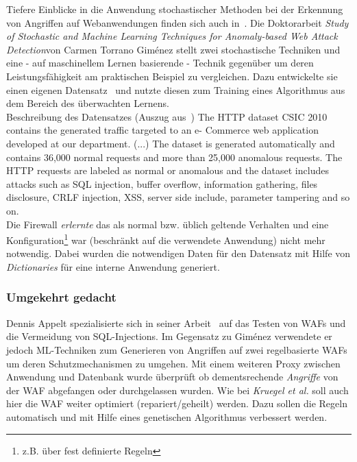 Tiefere Einblicke in die Anwendung stochastischer Methoden bei der Erkennung von Angriffen auf Webanwendungen finden sich auch in~\cite{Giménez2015}. Die Doktorarbeit \glqq\emph{Study of Stochastic and Machine Learning Techniques for Anomaly-based Web Attack Detection}\grqq von Carmen Torrano Giménez stellt zwei stochastische Techniken und eine - auf maschinellem Lernen basierende - Technik gegenüber um deren Leistungsfähigkeit am praktischen Beispiel zu vergleichen. Dazu entwickelte sie einen eigenen Datensatz~\cite{csic2010} und nutzte diesen zum Training eines Algorithmus aus dem Bereich des überwachten Lernens.\\

\textcolor{bhtGray}{ Beschreibung des Datensatzes (Auszug aus~\cite{csic2010})} The HTTP dataset CSIC 2010 contains the generated traffic targeted to an e- Commerce web application developed at our department. (...) The dataset is generated automatically and contains 36,000 normal requests and more than 25,000 anomalous requests. The HTTP requests are labeled as normal or anomalous and the dataset includes attacks such as SQL injection, buffer overflow, information gathering, files disclosure, CRLF injection, XSS, server side include, parameter tampering and so on.\\

Die Firewall \emph{erlernte} das als normal bzw. üblich geltende Verhalten und eine Konfiguration\footnote{z.B. über fest definierte Regeln} war (beschränkt auf die verwendete Anwendung) nicht mehr notwendig. Dabei wurden die notwendigen Daten für den Datensatz mit Hilfe von \emph{Dictionaries} für eine interne Anwendung generiert. 


\subsubsection{Umgekehrt gedacht}

Dennis Appelt spezialisierte sich in seiner Arbeit~\cite{Appelt2016} auf das Testen von WAFs und die Vermeidung von SQL-Injections. Im Gegensatz zu Giménez verwendete er jedoch ML-Techniken zum Generieren von Angriffen auf zwei regelbasierte WAFs um deren Schutzmechanismen zu umgehen. Mit einem weiteren Proxy zwischen Anwendung und Datenbank wurde überprüft ob dementsrechende \emph{Angriffe} von der WAF abgefangen oder durchgelassen wurden. Wie bei \emph{Kruegel et al.} soll auch hier die WAF weiter optimiert (repariert/geheilt) werden. Dazu sollen die Regeln automatisch und mit Hilfe eines genetischen Algorithmus verbessert werden.

